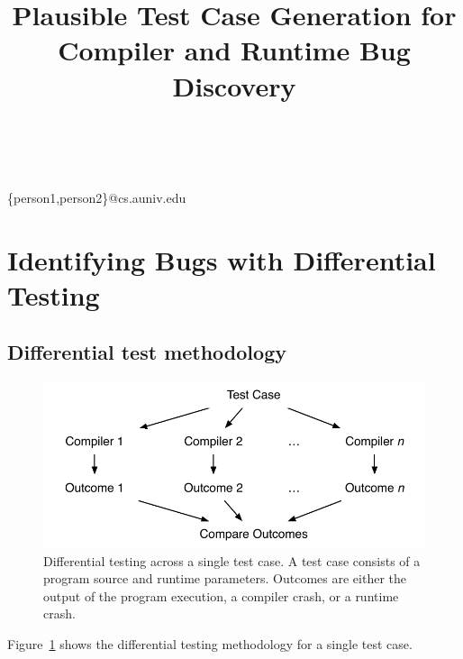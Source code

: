 



\title{Plausible Test Case Generation for Compiler and Runtime Bug Discovery}

%
%
{ \\
          \\
        }
{\{person1,person2\}@cs.auniv.edu}

\maketitle






\section{Identifying Bugs with Differential Testing}

\subsection{Differential test methodology}

\begin{figure}
  \centering
  \includegraphics[width=.9\columnwidth]{img/difftest} %
  \caption{%
    Differential testing across a single test case. A test case consists of a program source and runtime parameters. Outcomes are either the output of the program execution, a compiler crash, or a runtime crash.%
  }%
  \label{fig:difftest}
\end{figure}

Figure~\ref{fig:difftest} shows the differential testing methodology for a single test case.


